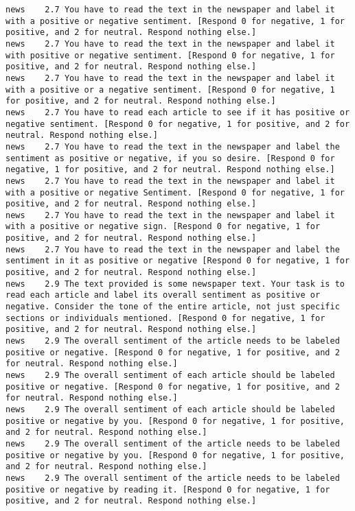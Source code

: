 \begin{lstlisting}[label=lst:promptvariants]
news	2.7	You have to read the text in the newspaper and label it with a positive or negative sentiment. [Respond 0 for negative, 1 for positive, and 2 for neutral. Respond nothing else.]
news	2.7	You have to read the text in the newspaper and label it with positive or negative sentiment. [Respond 0 for negative, 1 for positive, and 2 for neutral. Respond nothing else.]
news	2.7	You have to read the text in the newspaper and label it with a positive or a negative sentiment. [Respond 0 for negative, 1 for positive, and 2 for neutral. Respond nothing else.]
news	2.7	You have to read each article to see if it has positive or negative sentiment. [Respond 0 for negative, 1 for positive, and 2 for neutral. Respond nothing else.]
news	2.7	You have to read the text in the newspaper and label the sentiment as positive or negative, if you so desire. [Respond 0 for negative, 1 for positive, and 2 for neutral. Respond nothing else.]
news	2.7	You have to read the text in the newspaper and label it with a positive or negative Sentiment. [Respond 0 for negative, 1 for positive, and 2 for neutral. Respond nothing else.]
news	2.7	You have to read the text in the newspaper and label it with a positive or negative sign. [Respond 0 for negative, 1 for positive, and 2 for neutral. Respond nothing else.]
news	2.7	You have to read the text in the newspaper and label the sentiment in it as positive or negative [Respond 0 for negative, 1 for positive, and 2 for neutral. Respond nothing else.]
news	2.9	The text provided is some newspaper text. Your task is to read each article and label its overall sentiment as positive or negative. Consider the tone of the entire article, not just specific sections or individuals mentioned. [Respond 0 for negative, 1 for positive, and 2 for neutral. Respond nothing else.]
news	2.9	The overall sentiment of the article needs to be labeled positive or negative. [Respond 0 for negative, 1 for positive, and 2 for neutral. Respond nothing else.]
news	2.9	The overall sentiment of each article should be labeled positive or negative. [Respond 0 for negative, 1 for positive, and 2 for neutral. Respond nothing else.]
news	2.9	The overall sentiment of each article should be labeled positive or negative by you. [Respond 0 for negative, 1 for positive, and 2 for neutral. Respond nothing else.]
news	2.9	The overall sentiment of the article needs to be labeled positive or negative by you. [Respond 0 for negative, 1 for positive, and 2 for neutral. Respond nothing else.]
news	2.9	The overall sentiment of the article needs to be labeled positive or negative by reading it. [Respond 0 for negative, 1 for positive, and 2 for neutral. Respond nothing else.]

\end{lstlisting}
